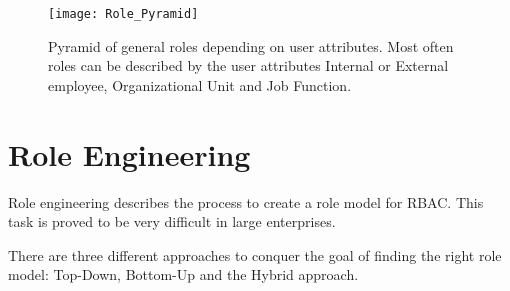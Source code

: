         \begin{figure}[H]
            \centering
            \texttt{[image: Role\_Pyramid]}
            \caption{Pyramid of general roles depending on user attributes. Most often roles can be described by the user attributes Internal or External employee, Organizational Unit and Job Function.}
            \label{fig:rolePyramid}
        \end{figure}
        \fi
    
    \section{Role Engineering}
    Role engineering \cite{Coyne:2011} describes the process to create a role model for RBAC. This task is proved to be very difficult in large enterprises.
    
    There are three different approaches to conquer the goal of finding the right role model: Top-Down, Bottom-Up and the Hybrid approach\cite{Coyne:2011}\cite{Frank}.
    
